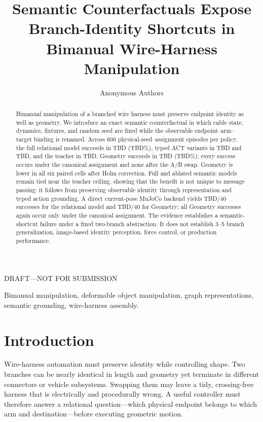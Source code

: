 \documentclass[journal]{IEEEtran}
\title{Semantic Counterfactuals Expose Branch-Identity Shortcuts in
Bimanual Wire-Harness Manipulation}
\author{Anonymous Authors}
\date{}
\newcommand{\draftwarning}{\textcolor{draftred}{DRAFT---NOT FOR SUBMISSION}}
\newcommand{\TopoCount}{TBD}
\newcommand{\TopoRate}{TBD}
\newcommand{\GeomCount}{TBD}
\newcommand{\GeomRate}{TBD}
\newcommand{\ACTPointerCount}{TBD}
\newcommand{\ACTRelCount}{TBD}
\newcommand{\TeacherCount}{TBD}
\newcommand{\MuJoCoTopoCount}{TBD}
\newcommand{\MuJoCoGeomCount}{TBD}
\begin{document}
\maketitle

\begin{center}
\draftwarning
\end{center}

\begin{abstract}
Bimanual manipulation of a branched wire harness must preserve endpoint
identity as well as geometry. We introduce an exact semantic counterfactual in
which cable state, dynamics, fixtures, and random seed are fixed while the
observable endpoint--arm--target binding is renamed. Across 600
physical-seed--assignment episodes per policy, the full relational model
succeeds in \TopoCount{} (\TopoRate\%), typed ACT variants in
\ACTPointerCount{} and \ACTRelCount, and the teacher in \TeacherCount. Geometry
succeeds in \GeomCount{} (\GeomRate\%); every success occurs under the canonical
assignment and none after the A/B swap. Geometry is lower in all six paired
cells after Holm correction. Full and ablated semantic models remain tied near
the teacher ceiling, showing that the benefit is not unique to message passing:
it follows from preserving observable identity through representation and
typed action grounding. A direct current-pose MuJoCo backend yields
\MuJoCoTopoCount/40 successes for the relational model and
\MuJoCoGeomCount/40 for Geometry; all Geometry successes again occur only under
the canonical assignment. The evidence establishes a semantic-shortcut failure
under a fixed two-branch abstraction. It does not establish 3--5 branch
generalization, image-based identity perception, force control, or production
performance.
\end{abstract}

\begin{IEEEkeywords}
Bimanual manipulation, deformable object manipulation, graph representations,
semantic grounding, wire-harness assembly.
\end{IEEEkeywords}

\section{Introduction}

Wire-harness automation must preserve identity while controlling shape.  Two
branches can be nearly identical in length and geometry yet terminate in
different connectors or vehicle subsystems.  Swapping them may leave a tidy,
crossing-free harness that is electrically and procedurally wrong.  A useful
controller must therefore answer a relational question---which physical
endpoint belongs to which arm and destination---before executing geometric
motion.
\end{document}
